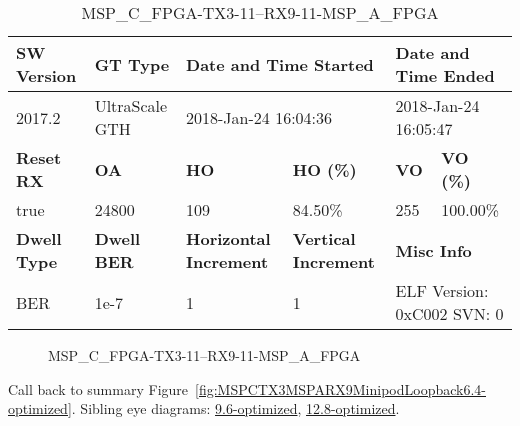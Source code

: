 \begin{table}[h]
\centering
\caption{MSP\_C\_FPGA-TX3-11--RX9-11-MSP\_A\_FPGA}
\label{tab:MSPCFPGATX311RX911MSPAFPGA6.4-optimized}
\begin{tabular}{@{}|l|l|l|l|l|l|@{}}
\toprule
\textbf{SW Version}                & \textbf{GT Type}   & \multicolumn{2}{l|}{\textbf{Date and Time Started}}            & \multicolumn{2}{l|}{\textbf{Date and Time Ended}}        \\ \midrule
2017.2                       & UltraScale GTH          & \multicolumn{2}{l|}{2018-Jan-24 16:04:36}                   & \multicolumn{2}{l|}{2018-Jan-24 16:05:47}               \\ \midrule
\textbf{Reset RX}                  & \textbf{OA} & \textbf{HO}   & \textbf{HO (\%)} & \textbf{VO} & \textbf{VO (\%)} \\ \midrule
true & 24800        & 109          & 84.50\%        & 255        & 100.00\%       \\ \midrule
\textbf{Dwell Type}                & \textbf{Dwell BER} & \textbf{Horizontal Increment} & \textbf{Vertical Increment}    & \multicolumn{2}{l|}{\textbf{Misc Info}}                  \\ \midrule
BER                            & 1e-7        & 1        & 1           & \multicolumn{2}{l|}{ELF Version: 0xC002 SVN: 0}                         \\ \bottomrule
\end{tabular}
\end{table}

\begin{figure}[h]
\caption{MSP\_C\_FPGA-TX3-11--RX9-11-MSP\_A\_FPGA} \label{fig:MSPCFPGATX311RX911MSPAFPGA6.4-optimized}
\end{figure}

Call back to summary Figure~\ref{fig:MSPCTX3MSPARX9MinipodLoopback6.4-optimized}.
Sibling eye diagrams: \hyperref[sec:MSPCFPGATX311RX911MSPAFPGA9.6-optimized]{9.6-optimized}, \hyperref[sec:MSPCFPGATX311RX911MSPAFPGA12.8-optimized]{12.8-optimized}.

\clearpage
\newpage

